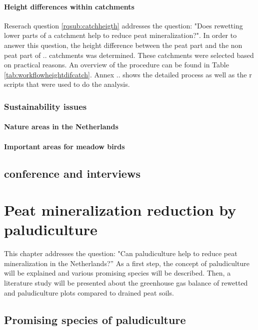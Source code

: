\documentclass[a4paper,12pt]{scrbook}
\begin{document}
\subsubsection{Height differences within catchments}
Reserach question \ref{rqsub:catchheigth} addresses the question: "Does rewetting lower parts of a catchment help to reduce peat mineralization?". In order to answer this question, the height difference between the peat part and the non peat part of .. catchments was determined. These catchments were selected based on practical reasons. An overview of the procedure can be found in Table \ref{tab:workflowheightdifcatch}. Annex .. shows the detailed process as well as the r scripts that were used to do the analysis.

\subsection{Sustainability issues}

\subsubsection{Nature areas in the Netherlands}

\subsubsection{Important areas for meadow birds}


\section{conference and interviews}

\chapter{Peat mineralization reduction by paludiculture}

This chapter addresses the question: "Can paludiculture help to reduce peat mineralization in the Netherlands?” As a first step, the concept of paludiculture will be explained and various promising species will be described. Then, a literature study will be presented about the greenhouse gas balance of rewetted and paludiculture plots compared to drained peat soils.

\section{Promising species of paludiculture}
\end{document}
